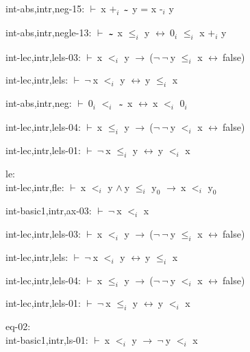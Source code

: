 \documentclass[a4paper]{article}
\newcommand{\tildesym}{\raisebox{-4pt}{\bf\~{}}}
\newcommand{\Fol}{\mbox{$\vdash\ $}}
\newcommand{\Not}{\mbox{$\neg\ $}}
\newcommand{\And}{\mbox{$\wedge\ $}}
\newcommand{\Imp}{\mbox{$\rightarrow\ $}}
\newcommand{\Equiv}{\mbox{$\leftrightarrow\ $}}
\begin{document}
int-abs,intr,neg-15: 
 \Fol x $\mbox{+}_{i}$ $\tildesym$ y = x $\mbox{-}_{i}$ y



int-abs,intr,negle-13: 
 \Fol $\tildesym$ x $\mbox{$\le$}_{i}$ y \Equiv $\mbox{0}_{i}$ $\mbox{$\le$}_{i}$ x $\mbox{+}_{i}$ y



int-lec,intr,lels-03: 
 \Fol x $\mbox{$<$}_{i}$ y \Imp (\Not \Not y $\mbox{$\le$}_{i}$ x \Equiv false)



int-lec,intr,lels: 
 \Fol \Not x $\mbox{$<$}_{i}$ y \Equiv y $\mbox{$\le$}_{i}$ x



int-abs,intr,neg: 
 \Fol $\mbox{0}_{i}$ $\mbox{$<$}_{i}$ $\tildesym$ x \Equiv x $\mbox{$<$}_{i}$ $\mbox{0}_{i}$



int-lec,intr,lels-04: 
 \Fol x $\mbox{$\le$}_{i}$ y \Imp (\Not \Not y $\mbox{$<$}_{i}$ x \Equiv false)



int-lec,intr,lels-01: 
 \Fol \Not x $\mbox{$\le$}_{i}$ y \Equiv y $\mbox{$<$}_{i}$ x



\bigskip

le:\\ int-lec,intr,fle: 
 \Fol x $\mbox{$<$}_{i}$ y \And y $\mbox{$\le$}_{i}$ $\mbox{y}_{0}$ \Imp x $\mbox{$<$}_{i}$ $\mbox{y}_{0}$

int-basic1,intr,ax-03: 
 \Fol \Not x $\mbox{$<$}_{i}$ x



int-lec,intr,lels-03: 
 \Fol x $\mbox{$<$}_{i}$ y \Imp (\Not \Not y $\mbox{$\le$}_{i}$ x \Equiv false)



int-lec,intr,lels: 
 \Fol \Not x $\mbox{$<$}_{i}$ y \Equiv y $\mbox{$\le$}_{i}$ x



int-lec,intr,lels-04: 
 \Fol x $\mbox{$\le$}_{i}$ y \Imp (\Not \Not y $\mbox{$<$}_{i}$ x \Equiv false)



int-lec,intr,lels-01: 
 \Fol \Not x $\mbox{$\le$}_{i}$ y \Equiv y $\mbox{$<$}_{i}$ x



\bigskip

eq-02:\\ int-basic1,intr,ls-01: 
 \Fol x $\mbox{$<$}_{i}$ y \Imp \Not y $\mbox{$<$}_{i}$ x
\end{document}

